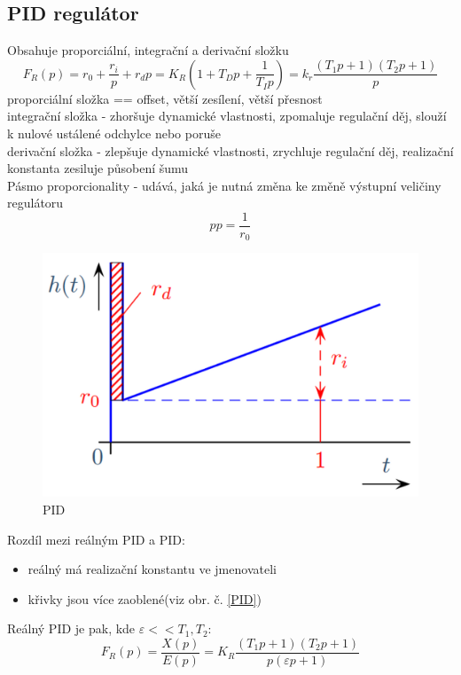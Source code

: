 \subsection*{PID regulátor}
Obsahuje proporciální, integrační a derivační složku
\begin{equation}
    F_R(p) = r_0 + \frac{r_i}{p} + r_d p= K_R(1+T_Dp+\frac{1}{T_Ip}) = k_r\frac{(T_1p+1)(T_2p+1)}{p}
\end{equation}
proporciální složka == offset, větší zesílení, větší přesnost \\
integrační složka - zhoršuje dynamické vlastnosti, zpomaluje regulační děj, slouží k nulové ustálené odchylce nebo poruše\\
derivační složka - zlepšuje dynamické vlastnosti, zrychluje regulační děj, realizační konstanta zesiluje působení šumu\\
Pásmo proporcionality - udává, jaká je nutná změna ke změně výstupní veličiny regulátoru
\begin{equation}
    pp = \frac{1}{r_0}
\end{equation}
\begin{figure}[H]
    \includegraphics[scale = 0.3]{images/pasmo_proporcionality.png}
    \caption{PID}
\end{figure}
Rozdíl mezi reálným PID a PID:
\begin{itemize}
    \item reálný má realizační konstantu ve jmenovateli
    \item křivky jsou více zaoblené(viz obr. č. \ref{PID})
\end{itemize}
Reálný PID je pak, kde \(\varepsilon << T_1,T_2\):
\begin{equation}
    F_R(p) = \frac{X(p)}{E(p)} = K_R\frac{(T_1p + 1)(T_2p+1)}{p(\varepsilon p +1)}
\end{equation}
